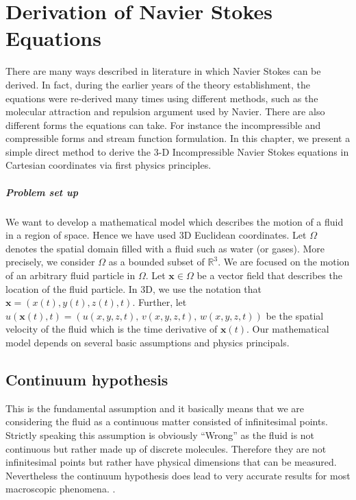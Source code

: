 \chapter{Derivation of Navier Stokes Equations}
\label{chapter2}
There are many ways described in literature in which Navier Stokes can be derived. In fact, during the earlier years of the theory establishment, the equations were re-derived many times using different methods, such as the molecular attraction and repulsion argument used by Navier. There are also different forms the equations can take. For instance the incompressible and compressible forms and stream function formulation. In this chapter, we present a simple direct method to derive the 3-D Incompressible Navier Stokes equations in Cartesian coordinates via first physics principles.\\

\paragraph*{Problem set up}
We want to develop a mathematical model which describes the motion of a fluid in a region of space. Hence we have used 3D Euclidean coordinates. Let $\Omega$ denotes the spatial domain filled with a fluid such as water (or gases). More precisely, we consider $\Omega$ as a bounded subset of $\mathbb{R}^3$. We are focused on the motion of an arbitrary fluid particle in $\Omega$. Let $\textbf{x} \in \Omega$ be a vector field that describes the location of the fluid particle. In 3D, we use the notation that $\textbf{x} = (x(t), y(t), z(t), t)$. Further, let $u(\textbf{x}(t), t) = \left( u(x,y,z,t),\,v(x,y,z,t),\,w(x,y,z,t)\right)$ be the spatial velocity of the fluid which is the time derivative of $\textbf{x}(t)$. Our mathematical model depends on several basic assumptions and physics principals.\\

\section{Continuum hypothesis}
This is the fundamental assumption and it basically means that we are considering the fluid as a continuous matter consisted of infinitesimal points. Strictly speaking this assumption is obviously ``Wrong'' as the fluid is not continuous but rather made up of discrete molecules. Therefore they are not infinitesimal points but rather have physical dimensions that can be measured. Nevertheless the continuum hypothesis does lead to very accurate results for most macroscopic phenomena. \cite{chorin1990mathematical}.\\

